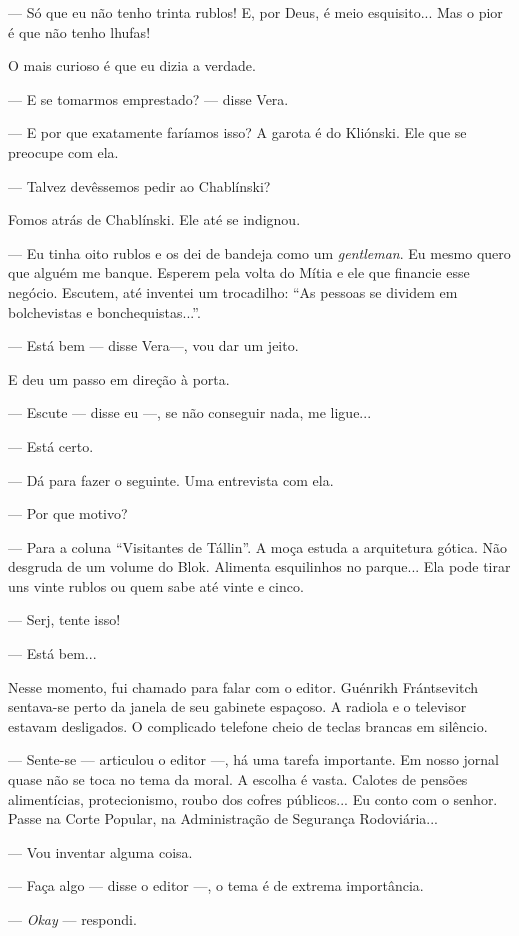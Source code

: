--- Só que eu não tenho trinta rublos! E, por Deus, é meio esquisito...
Mas o pior é que não tenho lhufas!

O mais curioso é que eu dizia a verdade.

--- E se tomarmos emprestado? --- disse Vera.

--- E por que exatamente faríamos isso? A garota é do Kliónski. Ele que
se preocupe com ela.

--- Talvez devêssemos pedir ao Chablínski?

Fomos atrás de Chablínski. Ele até se indignou.

--- Eu tinha oito rublos e os dei de bandeja como um \emph{gentleman}.
Eu mesmo quero que alguém me banque. Esperem pela volta do Mítia e ele
que financie esse negócio. Escutem, até inventei um trocadilho: ``As
pessoas se dividem em bolchevistas e bonchequistas...''.

--- Está bem --- disse Vera---, vou dar um jeito.

E deu um passo em direção à porta.

--- Escute --- disse eu ---, se não conseguir nada, me ligue...

--- Está certo.

--- Dá para fazer o seguinte. Uma entrevista com ela.

--- Por que motivo?

--- Para a coluna ``Visitantes de Tállin''. A moça estuda a arquitetura
gótica. Não desgruda de um volume do Blok. Alimenta esquilinhos no
parque... Ela pode tirar uns vinte rublos ou quem sabe até vinte e
cinco.

--- Serj, tente isso!

--- Está bem...

Nesse momento, fui chamado para falar com o editor. Guénrikh
Frántsevitch sentava-se perto da janela de seu gabinete espaçoso. A
radiola e o televisor estavam desligados. O complicado telefone cheio de
teclas brancas em silêncio.

--- Sente-se --- articulou o editor ---, há uma tarefa importante. Em
nosso jornal quase não se toca no tema da moral. A escolha é vasta.
Calotes de pensões alimentícias, protecionismo, roubo dos cofres
públicos... Eu conto com o senhor. Passe na Corte Popular, na
Administração de Segurança Rodoviária...

--- Vou inventar alguma coisa.

--- Faça algo --- disse o editor ---, o tema é de extrema importância.

--- \emph{Okay} --- respondi.

